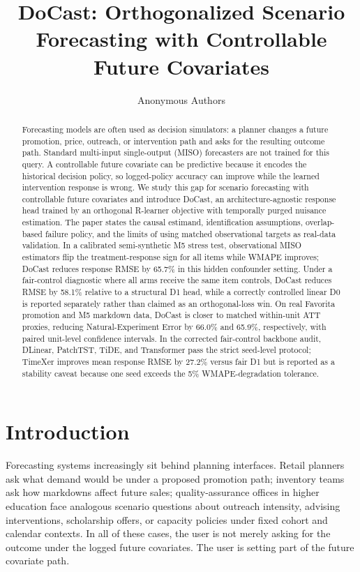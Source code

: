 \documentclass[11pt]{article}
\title{DoCast: Orthogonalized Scenario Forecasting with Controllable Future Covariates}
\author{Anonymous Authors}
\date{}
\begin{document}
\maketitle

\begin{abstract}
Forecasting models are often used as decision simulators: a planner changes a
future promotion, price, outreach, or intervention path and asks for the
resulting outcome path. Standard multi-input single-output (MISO) forecasters
are not trained for this query. A controllable future covariate can be
predictive because it encodes the historical decision policy, so logged-policy
accuracy can improve while the learned intervention response is wrong. We study
this gap for scenario forecasting with controllable future covariates and
introduce DoCast, an architecture-agnostic response head trained by an
orthogonal R-learner objective with temporally purged nuisance estimation. The
paper states the causal estimand, identification assumptions, overlap-based
failure policy, and the limits of using matched observational targets as
real-data validation. In a calibrated semi-synthetic M5 stress test,
observational MISO estimators flip the treatment-response sign for all items
while WMAPE improves; DoCast reduces response RMSE by 65.7\% in this hidden
confounder setting. Under a fair-control diagnostic where all arms receive the
same item controls, DoCast reduces RMSE by 58.1\% relative to a structural D1
head, while a correctly controlled linear D0 is reported separately rather than
claimed as an orthogonal-loss win. On real Favorita promotion and M5 markdown
data, DoCast is closer to matched within-unit ATT proxies, reducing
Natural-Experiment Error by 66.0\% and 65.9\%, respectively, with paired
unit-level confidence intervals. In the corrected fair-control backbone audit,
DLinear, PatchTST, TiDE, and Transformer pass the strict seed-level protocol;
TimeXer improves mean response RMSE by 27.2\% versus fair D1 but is reported as
a stability caveat because one seed exceeds the 5\% WMAPE-degradation tolerance.
\end{abstract}

\section{Introduction}

Forecasting systems increasingly sit behind planning interfaces. Retail
planners ask what demand would be under a proposed promotion path; inventory
teams ask how markdowns affect future sales; quality-assurance offices in
higher education face analogous scenario questions about outreach intensity,
advising interventions, scholarship offers, or capacity policies under fixed
cohort and calendar contexts. In all of these cases, the user is not merely
asking for the outcome under the logged future covariates. The user is setting
part of the future covariate path.
\end{document}
